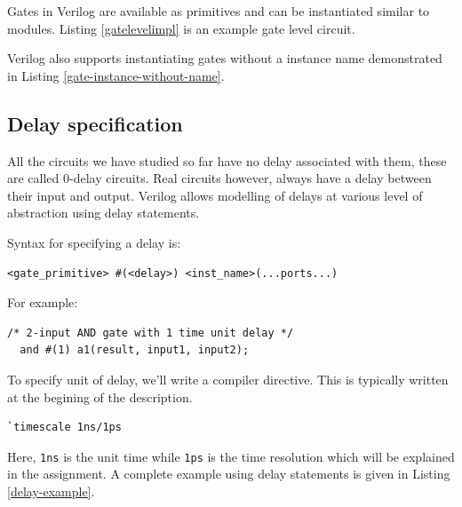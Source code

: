 \documentclass[a4paper,10pt]{article}
\theoremstyle{mytheor}
\newcommand{
  \insertverilog}[3]{
  
}
\newcommand{\inlinev}[1]{\lstinline[style=verilog-inline-style]{#1}}
\begin{document}
Gates in Verilog are available as primitives and can be instantiated
similar to modules. Listing \ref{gatelevelimpl} is an example gate
level circuit.

\insertverilog{./verilog_files/gateLevelExample.v}{gatelevelimpl}{\text{Example
    module using Gate-level modelling}}

Verilog also supports instantiating gates without a instance name
demonstrated in Listing \ref{gate-instance-without-name}.
\insertverilog{./verilog_files/unnamedGate.v}{gate-instance-without-name}{\text{Instantiating
    unnamed gates}}

\subsection{Delay specification}
All the circuits we have studied so far have no delay associated with
them, these are called 0-delay circuits. Real circuits however, always
have a delay between their input and output. Verilog allows modelling
of delays at various level of abstraction using delay statements.

Syntax for specifying a delay is:
\begin{lstlisting}[style=verilog-inline-style, xleftmargin=0.2\textwidth]
  <gate_primitive> #(<delay>) <inst_name>(...ports...) 
\end{lstlisting}

For example:
\begin{lstlisting}[style=verilog-inline-style, xleftmargin=0.25\textwidth]
  /* 2-input AND gate with 1 time unit delay */
  and #(1) a1(result, input1, input2);
\end{lstlisting}

\vspace{0.1cm} To specify unit of delay, we'll write a compiler
directive. This is typically written at the begining of the
description.

\begin{center}
  \begin{lstlisting}[style=verilog-inline-style,xleftmargin=.35\textwidth]
    `timescale 1ns/1ps
  \end{lstlisting}
\end{center}

Here, \inlinev{1ns} is the unit time while
\inlinev{1ps} is the time resolution which will be
explained in the assignment. A complete example using delay
statements is given in Listing \ref{delay-example}.

\insertverilog{./verilog_files/delayExample.v}{delay-example}{\text{Example
    usage of delays statement to specify propagation delay of logic
    gates.}}
\end{document}
